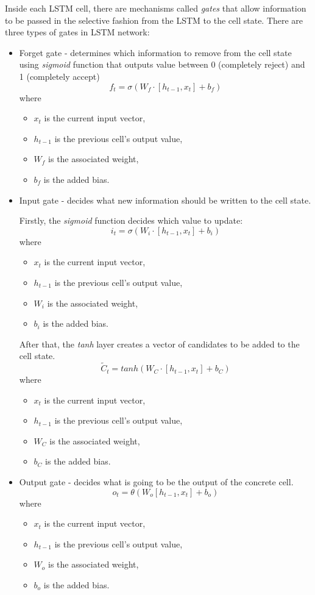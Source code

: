 Inside each LSTM cell, there are mechanisms called \emph{gates} that allow information to be passed in the selective fashion from the LSTM to the cell state. 
There are three types of gates in LSTM network:
\begin{itemize}
	\item {Forget gate} - determines which information to remove from the cell state using \textit{sigmoid} function that outputs value between 0 (completely reject) and 1 (completely accept)
		$$ f_{t} = \sigma (W_{f} \cdot [h_{t-1}, x_{t}] + b_{f}) $$
		where
		\begin{itemize}
			\item[] $ x_{t} $ is the current input vector,
			\item[] $ h_{t-1} $ is the previous cell's output value,
			\item[] $ W_{f} $ is the associated weight,
			\item[] $ b_{f} $ is the added bias.
		\end{itemize}
	\item {Input gate} - decides what new information should be written to the cell state. 
	
	Firstly, the \textit{sigmoid} function decides which value to update:
	$$ i_{t} = \sigma (W_{i} \cdot [h_{t-1}, x_{t}] + b_{i}) $$ 
	where
	\begin{itemize}
		\item[] $ x_{t} $ is the current input vector,
		\item[] $ h_{t-1} $ is the previous cell's output value,
		\item[] $ W_{i} $ is the associated weight,
		\item[] $ b_{i} $ is the added bias.
	\end{itemize}

	After that, the \emph{tanh} layer creates a vector of candidates to be added to the cell state. 
	$$ \tilde{C}_{t} = tanh (W_{C} \cdot [h_{t-1}, x_{t}] + b_{C}) $$
	where
	\begin{itemize}
		\item[] $ x_{t} $ is the current input vector,
		\item[] $ h_{t-1} $ is the previous cell's output value,
		\item[] $ W_{C} $ is the associated weight,
		\item[] $ b_{C} $ is the added bias.
	\end{itemize}
	\item {Output gate} - decides what is going to be the output of the concrete cell. 
	$$ o_{t} = \theta (W_{o} [h_{t-1}, x_{t}] + b_{o}) $$ 
	where
	\begin{itemize}
		\item[] $ x_{t} $ is the current input vector,
		\item[] $ h_{t-1} $ is the previous cell's output value,
		\item[] $ W_{o} $ is the associated weight,
		\item[] $ b_{o} $ is the added bias.
	\end{itemize}
	

\end{itemize}
